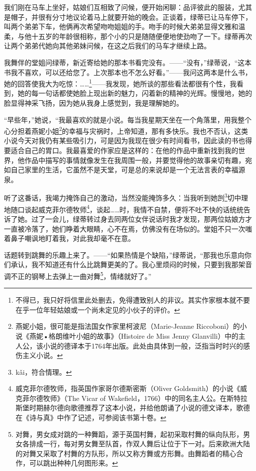 \documentclass[12pt,oneside]{book}
\begin{document}
我们刚在马车上坐好，姑娘们互相致了问候，便开始闲聊：品评彼此的服装，尤其是帽子，并很有分寸地议论着马上就要开始的晚会。正谈着，绿蒂已让马车停下，叫两个弟弟下车，他俩再次希望吻吻姐姐的手。吻手的时候大弟弟显得文雅和温柔，与他十五岁的年龄很相称，那个小的只是随随便便地使劲吻了一下。绿蒂再次让两个弟弟代她向其他弟妹问候，在这之后我们的马车才继续上路。

我舞伴的堂姐问绿蒂，新近寄给她的那本书看完没有。——“没有，”绿蒂说，“这本书我不喜欢，可以还给您了。上次那本也不怎么好看。”——我问这两本是什么书，她的回答使我大为吃惊：……\footnote{不得已，我只好将信里此处删去，免得遭致别人的非议。其实作家根本就不要在乎一位年轻姑娘或一个尚未定见的小伙子的评价。}——我发现，她所谈的那些看法都很有个性，我看到，她的每一句话都使她脸上现出新的魅力，闪着新的精神的光辉。慢慢地，她的脸显得神采飞扬，因为她从我身上感觉到，我是理解她的。

“早些年，”她说，“我最喜欢的就是小说。每当我星期天坐在一个角落里，用我整个心分担着燕妮小姐\footnote{燕妮小姐，很可能是指法国女作家里柯波尼（Marie-Jeanne Riccoboni）的小说《燕妮•格朗维叶小姐的故事》（Histoire de Miss Jenny Glanvilli）中的主人公，该小说的德译本于1764年出版。此处由具体到一般，泛指当时时兴的感伤主义小说。}的幸福与灾祸时，上帝知道，那有多快乐。我也不否认，这类小说今天对我仍有某些吸引力，可是因为我现在很少有时间看书，因此读的书也得要适合自己的胃口。我最喜爱的作家应是这样的：在他的作品中重新找到我的世界，他作品中描写的事情就像发生在我周围一般，并要觉得他的故事亲切有趣，宛如自己家里的生活，它虽然不是天堂，可是总的来说却是一个无法言表的幸福源泉。

听了这番话，我竭力掩饰自己的激动，当然没能掩饰多久：当我听到她剀\footnote{kǎi，符合情理。}切中理地随口谈起威克菲尔德牧师\footnote{威克菲尔德牧师，指英国作家哥尔德斯密斯（Oliver Goldsmith）的小说《威克菲尔德牧师》（The Vicar of Wakefield，1766）中的同名主人公。在斯特拉斯堡时期赫尔德向歌德推荐了这本小说，并给他朗诵了小说的德文译本，歌德在《诗与真》中作了记述，可参阅该书第十卷。}，谈起……时，我情不自禁，便将不吐不快的话统统告诉了她。过了一会儿，绿蒂转过身去同两位女伴说话时我才发现，那两位姑娘方才一直被冷落了，她们睁着大眼睛，心不在焉，仿佛没有在场似的。堂姐不只一次嗤着鼻子嘲讽地盯着我，对此我却毫不在意。

话题转到跳舞的乐趣上来了。——“如果热情是个缺陷，”绿蒂说，“那我也乐意向你们承认，我不知道还有什么比跳舞更美的了。我心里烦闷的时候，只要到我那架音调不正的钢琴上去弹上一曲对舞\footnote{对舞，男女成对跳的一种舞蹈，源于英国村舞，起初采取村舞的纵向队形，男女各排成一行，每对男女舞至队首，作双人舞后让位于下一对。后来欧洲大陆的对舞又采取了村舞的方队形，所以又称方舞或方形舞。由舞蹈者的精心合作，可以跳出种种几何图形来。}，情绪就好了。”
\end{document}
